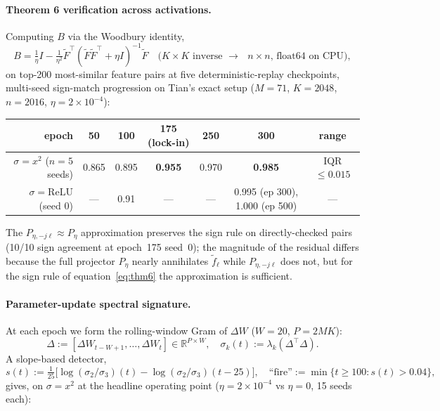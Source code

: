 \documentclass[11pt]{article}
\newcommand{\R}{\mathbb{R}}
\newcommand{\Ftil}{\widetilde{F}}
\begin{document}
\paragraph{Theorem 6 verification across activations.} Computing $B$ via
the Woodbury identity,
\begin{equation}
B = \tfrac{1}{\eta} I - \tfrac{1}{\eta^2}\Ftil^\top
(\Ftil \Ftil^\top + \eta I)^{-1}\Ftil
\quad\text{($K\times K$ inverse $\to$ $n\times n$, float64 on CPU)},
\label{eq:woodbury}
\end{equation}
on top-200 most-similar feature pairs at five deterministic-replay
checkpoints, multi-seed sign-match progression on Tian's exact setup
($M=71$, $K=2048$, $n=2016$, $\eta=2\!\times\!10^{-4}$):
\begin{center}\small
\begin{tabular}{rcccccc}
\toprule
epoch & 50 & 100 & \textbf{175 (lock-in)} & 250 & 300 & range \\
\midrule
$\sigma=x^2$ ($n=5$ seeds) & 0.865 & 0.895 & \textbf{0.955} & 0.970 & \textbf{0.985} & IQR $\le 0.015$ \\
$\sigma=\mathrm{ReLU}$ (seed 0) & --- & 0.91 & --- & --- & 0.995 (ep 300), 1.000 (ep 500) & --- \\
\bottomrule
\end{tabular}
\end{center}

The $P_{\eta,-j\ell} \approx P_\eta$ approximation preserves the sign
rule on directly-checked pairs (10/10 sign agreement at epoch~175
seed~0); the magnitude of the residual differs because the full
projector $P_\eta$ nearly annihilates $\widetilde f_\ell$ while
$P_{\eta,-j\ell}$ does not, but for the sign rule of
equation~\eqref{eq:thm6} the approximation is sufficient.

\paragraph{Parameter-update spectral signature.} At each epoch we form
the rolling-window Gram of $\Delta W$ ($W=20$, $P=2MK$):
\begin{equation}
\Delta := [\Delta W_{t-W+1}, \ldots, \Delta W_t] \in \R^{P \times W},
\quad
\sigma_k(t) := \lambda_k(\Delta^\top \Delta).
\label{eq:gram}
\end{equation}
A slope-based detector,
\begin{equation}
s(t) := \tfrac{1}{25}\bigl[\log(\sigma_2/\sigma_3)(t) -
\log(\sigma_2/\sigma_3)(t-25)\bigr],
\quad \text{``fire''} := \min\{t \ge 100 : s(t) > 0.04\},
\label{eq:slope}
\end{equation}
gives, on $\sigma=x^2$ at the headline operating point ($\eta=2\!\times\!10^{-4}$
vs $\eta=0$, 15 seeds each):
\end{document}
